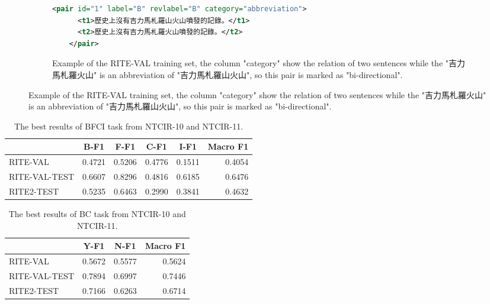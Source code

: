 \documentclass{article}
\begin{document}
\begin{CJK*}{UTF8}{bkai}
\begin{figure}[ht!]
  \begin{subfigure}{1\linewidth}
    \caption{Example of the RITE-VAL training set, the column "category" show the relation of two sentences while the "吉力馬札羅火山" is an abbreviation of "吉力馬札羅山火山", so this pair is marked as "bi-directional".}
    \begin{minipage}{\linewidth}
    \begin{lstlisting}[language=XML]
    <pair id="1" label="B" revlabel="B" category="abbreviation">
      <t1>歷史上沒有吉力馬札羅山火山噴發的記錄。</t1>
      <t2>歷史上沒有吉力馬札羅火山噴發的記錄。</t2>
    </pair>
    \end{lstlisting}
    \end{minipage}
  \end{subfigure}
\end{figure}


\begin{table}[ht!]
  \centering
  \begin{tabular}{|l|r|r|r|r|r|}
  \hline
   & \multicolumn{1}{c|}{B-F1} & \multicolumn{1}{c|}{F-F1} & \multicolumn{1}{c|}{C-F1} & \multicolumn{1}{c|}{I-F1} & \multicolumn{1}{c|}{Macro F1} \\ \hline
  RITE-VAL & 0.4721 & 0.5206 & 0.4776 & 0.1511 & 0.4054 \\ \hline
  RITE-VAL-TEST & 0.6607 & 0.8296 & 0.4816 & 0.6185 & 0.6476 \\ \hline
  RITE2-TEST & 0.5235 & 0.6463 & 0.2990 & 0.3841 & 0.4632 \\ \hline
  \end{tabular}
  \caption{The best results of BFCI task from NTCIR-10 and NTCIR-11.}
  \label{result:bfci_ntcir}
\end{table}

\begin{table}[ht!]
  \centering
  \begin{tabular}{|l|r|r|r|}
  \hline
   & \multicolumn{1}{c|}{Y-F1} & \multicolumn{1}{c|}{N-F1} & \multicolumn{1}{c|}{Macro F1} \\ \hline
  RITE-VAL & 0.5672 & 0.5577 & 0.5624 \\ \hline
  RITE-VAL-TEST & 0.7894 & 0.6997 & 0.7446 \\ \hline
  RITE2-TEST & 0.7166 & 0.6263 & 0.6714 \\ \hline
  \end{tabular}
  \caption{The best results of BC task from NTCIR-10 and NTCIR-11.}
  \label{result:bc_ntcir}
\end{table}


\end{CJK*}
\end{document}
